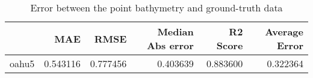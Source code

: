 \begin{table}[h!]
\caption{Error between the point bathymetry and ground-truth data}
\label{tab:oahu5_lidar_error}
\begin{tabular}{lrrrrr}
\toprule
 & MAE & RMSE & Median Abs error & R2 Score & Average Error \\
\midrule
oahu5 & 0.543116 & 0.777456 & 0.403639 & 0.883600 & 0.322364 \\
\bottomrule
\end{tabular}
\end{table}

